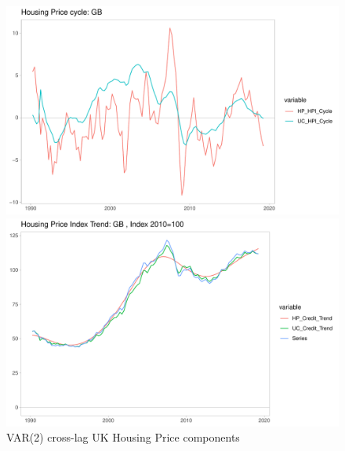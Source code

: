 \documentclass[fleqn]{article}
\begin{document}
\begin{outline}[enumerate]
\begin{figure}[h!]
	\caption{VAR(2) cross-lag UK Housing Price components}	
	\centerline{\includegraphics[scale=0.7]{../Output/Graphs/HP_cycle_GB.pdf}}
	\centerline{\includegraphics[scale=0.7]{../Output/Graphs/HP_trend_GB.pdf}}
\end{figure}


\end{outline}
\end{document}
